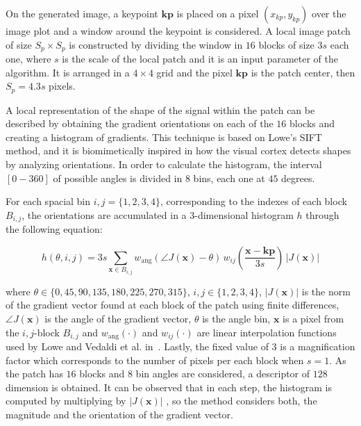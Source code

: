 \documentclass[entropy,article,submit,moreauthors,pdftex,10pt,a4paper]{mdpi}
\begin{document}
On the generated image, a keypoint $\mathbf{kp}$ is placed on a pixel $(x_{kp}, y_{kp})$ over the image plot and a window around the keypoint is considered. A local image patch of size $S_p \times S_p$ is constructed by dividing the window in $16$ blocks of size $3s$ each one,  where $s$ is the scale of the local patch and it is an input parameter of the algorithm. It is arranged in a $4 \times 4$ grid and the pixel $ \mathbf{kp}$ is the patch center, then $S_p = 4.3s $ pixels. 

A local representation of the shape of the signal within the patch can be described by obtaining the gradient orientations on each of the $16$ blocks and creating a histogram of gradients.  This technique is based on Lowe's SIFT~\citep{Lowe2004} method, and it is biomimetically inspired in how the visual cortex detects shapes by analyzing orientations.   In order to calculate the histogram, the interval $[0-360]$ of possible angles is divided in $8$ bins, each one at $45$ degrees.

 For each spacial bin $ i,j = \{1,2,3,4\} $, corresponding to the indexes of each block $B_{i,j}$,  the orientations are accumulated in a  $3$-dimensional histogram $h$ through the following equation: 
 

\begin{equation}
 h(\theta,i,j) = 3s \sum_{\mathbf{x} \in B_{i,j}} w_\mathrm{ang}(\angle J(\mathbf{x}) - \theta)\, w_{ij}\left(\frac{\mathbf{x} - \mathbf{kp}}{3 s}\right)\, |J(\mathbf{x})|
\label{eq:histogram}
\end{equation}

\noindent  where $ \theta \in \{0, 45, 90, 135, 180, 225, 270, 315\} $, $ i,j \in \{1,2,3,4\} $, $ |J(\mathbf{x})| $ is the norm of the gradient vector found at each block of the patch using finite differences, $\angle J(\mathbf{x}) $ is the angle of the gradient vector,  $\theta$ is the angle bin, $\mathbf{x}$ is a pixel from  the $i,j$-block $B_{i,j}$ and $ w_\mathrm{ang}(\cdot) $  and $ w_{ij}(\cdot) $ are linear interpolation functions used by Lowe and Vedaldi et al. in~\citep{Lowe2004,Vedaldi2010}.  Lastly, the fixed value of $ 3 $ is a magnification factor which corresponds to the number of pixels per each block when $s = 1$.  As the patch has  $16$ blocks and  $8$ bin angles are considered, a descriptor of $128$ dimension is obtained. It can be observed that in each step, the histogram is computed by multiplying by $ |J(\mathbf{x})| $ , so the method considers both, the magnitude and the orientation of the gradient vector. 
\end{document}

